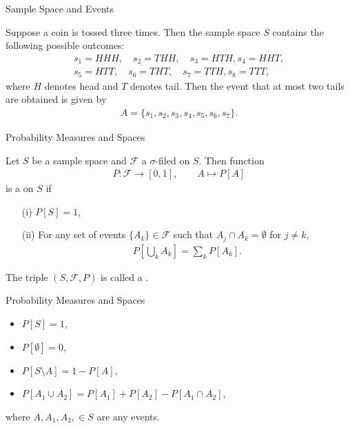 \begin{frame}{Sample Space and Events}

 Suppose a coin is tossed three times. Then the sample space $S$ contains the following possible outcomes:
\begin{align*}
s_1 = HHH, \quad s_2 = THH, \quad s_3 = HTH, s_4 = HHT, \\
s_5 = HTT, \quad s_6 = THT, \quad s_7 = TTH, s_8 = TTT,
\end{align*}
where $H$ denotes head and $T$ denotes tail. Then the event that at most two tails are obtained is given by
\begin{align*}
A = \{s_1, s_2, s_3, s_4, s_5, s_6, s_7\}.
\end{align*}


\end{frame}

\begin{frame}{Probability Measures and Spaces}

\justifying
{} Let $S$ be a sample space and $\mathcal{F}$ a $\sigma$-filed on $S$. Then function
\begin{align*}
P: \mathcal{F} \rightarrow [0, 1], \qquad A\mapsto P[A]
\end{align*}
is a  on $S$ if
\begin{enumerate}
	\justifying
	\item[(i)] $P[S] = 1$,
	\item[(ii)] For any set of events $\{A_k\} \in \mathcal{F}$ such that $A_j\cap A_k = \emptyset$ for $j\neq k$,
	\begin{align*}
	P\left[\underset{k}{\bigcup}A_k \right] = \sum_k P[A_k].
	\end{align*}
\end{enumerate}
The triple $(S, \mathcal{F}, P)$ is called a .

\end{frame}

\begin{frame}{Probability Measures and Spaces}

\justifying
{} 
\begin{itemize}
	\justifying
	\item $P[S] = 1$,
	\item $P[\emptyset] = 0$,
	\item $P[S\setminus A] = 1 - P[A]$,
	\item $P[A_1\cup A_2] = P[A_1] + P[A_2] - P[A_1\cap A_2]$,
\end{itemize}
where $A, A_1, A_2, \in S$ are any events.

\end{frame}


